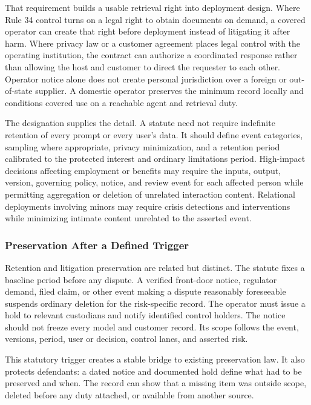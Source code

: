That requirement builds a usable retrieval right into deployment design. Where Rule 34 control turns on a legal right to obtain documents on demand, a covered operator can create that right before deployment instead of litigating it after harm. Where privacy law or a customer agreement places legal control with the operating institution, the contract can authorize a coordinated response rather than allowing the host and customer to direct the requester to each other. Operator notice alone does not create personal jurisdiction over a foreign or out-of-state supplier. A domestic operator preserves the minimum record locally and conditions covered use on a reachable agent and retrieval duty.

The designation supplies the detail. A statute need not require indefinite retention of every prompt or every user's data. It should define event categories, sampling where appropriate, privacy minimization, and a retention period calibrated to the protected interest and ordinary limitations period. High-impact decisions affecting employment or benefits may require the inputs, output, version, governing policy, notice, and review event for each affected person while permitting aggregation or deletion of unrelated interaction content. Relational deployments involving minors may require crisis detections and interventions while minimizing intimate content unrelated to the asserted event.

\subsubsection{Preservation After a Defined Trigger}

Retention and litigation preservation are related but distinct. The statute fixes a baseline period before any dispute. A verified front-door notice, regulator demand, filed claim, or other event making a dispute reasonably foreseeable suspends ordinary deletion for the risk-specific record. The operator must issue a hold to relevant custodians and notify identified control holders. The notice should not freeze every model and customer record. Its scope follows the event, versions, period, user or decision, control lanes, and asserted risk.

This statutory trigger creates a stable bridge to existing preservation law. It also protects defendants: a dated notice and documented hold define what had to be preserved and when. The record can show that a missing item was outside scope, deleted before any duty attached, or available from another source.

